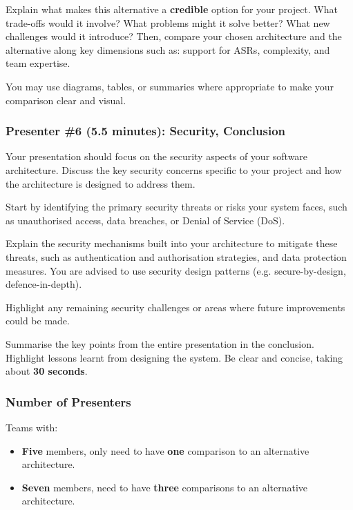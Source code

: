 \documentclass{csse4400}
\begin{document}
Explain what makes this alternative a \textbf{credible} option for your project.
What trade-offs would it involve?
What problems might it solve better?
What new challenges would it introduce?
Then, compare your chosen architecture and the alternative along key dimensions such as:
support for ASRs, complexity, and team expertise.

You may use diagrams, tables, or summaries where appropriate to make your comparison clear and visual.

\subsubsection{Presenter \#6 (5.5 minutes): Security, Conclusion}

Your presentation should focus on the security aspects of your software architecture.
Discuss the key security concerns specific to your project and how the architecture is designed to address them.

Start by identifying the primary security threats or risks your system faces,
such as unauthorised access, data breaches, or Denial of Service (DoS).

Explain the security mechanisms built into your architecture to mitigate these threats,
such as authentication and authorisation strategies, and data protection measures.
You are advised to use security design patterns (e.g. secure-by-design, defence-in-depth).

Highlight any remaining security challenges or areas where future improvements could be made.

Summarise the key points from the entire presentation in the conclusion.
Highlight lessons learnt from designing the system.
Be clear and concise, taking about \textbf{30 seconds}.

\subsubsection{Number of Presenters}

Teams with:
\begin{itemize}[topsep=5pt,partopsep=1pt,itemsep=3pt,parsep=3pt]
    \item \textbf{Five} members, only need to have \textbf{one} comparison to an alternative architecture.
    \item \textbf{Seven} members, need to have \textbf{three} comparisons to an alternative architecture.
\end{itemize}
\end{document}
